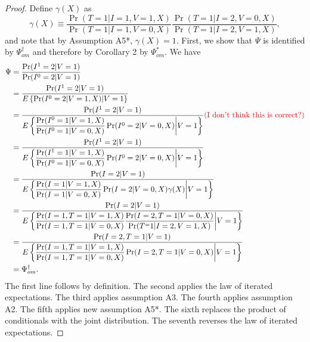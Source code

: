 \begin{appendix}
    \begin{proof}
        Define $\gamma(X)$ as 
        \begin{equation*}
            \gamma(X) \equiv \dfrac{\Pr(T = 1 | I = 1, V = 1, X)}{\Pr(T = 1 | I = 1, V = 0, X)} \dfrac{\Pr(T = 1 | I = 2, V = 0, X)}{\Pr(T = 1 | I = 2, V = 1, X)},
        \end{equation*}
        and note that by Assumption A5*, $\gamma(X) = 1$. First, we show that $\Psi$ is identified by $\Psi^\dagger_{om}$ and therefore by Corollary 2 by $\Psi^*_{om}$. We have
        \begin{align*}
            \Psi &= \dfrac{\Pr(I^1=2|V=1)}{\Pr(I^0=2|V=1)} \\
            &= \dfrac{\Pr(I^1=2|V=1)}{E\left\{\Pr(I^0=2|V=1, X) | V= 1 \right\}} \\
            &= \dfrac{\Pr(I^1=2|V=1)}{E\left\{\dfrac{\Pr(I^0=1|V=1, X)}{\Pr(I^0=1|V=0, X)}\Pr(I^0=2|V=0, X) \bigg| V= 1 \right\}} \text{\textcolor{red}{(I don't think this is correct?)}}\\
            &= \dfrac{\Pr(I^1=2|V=1)}{E\left\{\dfrac{\Pr(I^1=1|V=1, X)}{\Pr(I^0=1|V=0, X)}\Pr(I^0=2|V=0, X) \bigg| V= 1 \right\}} \\
            &= \dfrac{\Pr(I=2|V=1)}{E\left\{\dfrac{\Pr(I=1|V=1, X)}{\Pr(I=1|V=0, X)}\Pr(I=2|V=0, X) \gamma(X) \bigg| V= 1 \right\}} \\
            &= \dfrac{\Pr(I=2|V=1)}{E\left\{\dfrac{\Pr(I=1, T=1|V=1, X)}{\Pr(I=1, T = 1|V=0, X)} \dfrac{\Pr(I=2, T=1|V=0, X)}{\Pr(T^ = 1 | I = 2, V = 1, X)}\bigg| V= 1 \right\}} \\
            &= \dfrac{\Pr(I=2, T=1 |V=1)}{E\left\{\dfrac{\Pr(I=1, T=1|V=1, X)}{\Pr(I=1, T= 1|V=0, X)} \Pr(I=2, T=1|V=0, X) \bigg| V= 1 \right\}} \\
            &= \Psi^\dagger_{om}.
        \end{align*}
        The first line follows by definition. The second applies the law of iterated expectations. The third applies assumption A3. The fourth applies assumption A2. The fifth applies new assumption A5*. The sixth replaces the product of conditionals with the joint distribution. The seventh reverses the law of iterated expectations. 


\end{proof}
\end{appendix}
